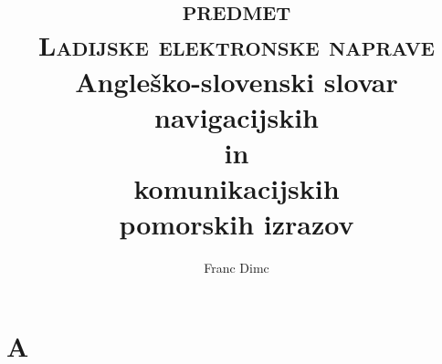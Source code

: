 \documentclass[10pt,a4paper,twoside]{article} %
\begin{document}
	\title{\textsc{predmet \\ Ladijske elektronske naprave}\\\vspace{1cm} {\Huge Angleško-slovenski slovar  navigacijskih \\ in \\ komunikacijskih \\ pomorskih izrazov}}
	\maketitle
	\begin{center}
		\author{Franc Dimc}
	\end{center}
	\newpage

\section*{A}
\end{document}
